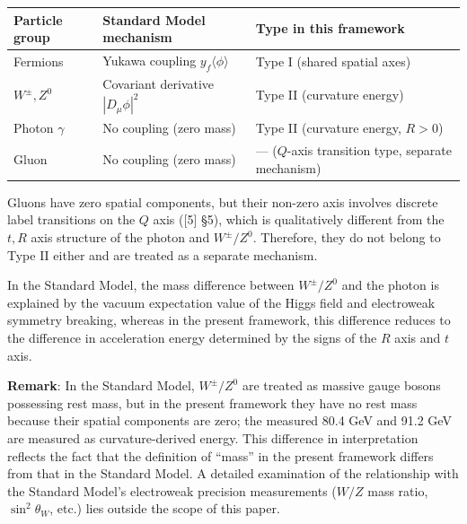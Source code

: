 \documentclass[
  a4paper,11pt]{article}
\newcounter{none}
\theoremstyle{definition}
\theoremstyle{remark}
\begin{document}
{\def\LTcaptype{none} %
\begin{longtable}[]{@{}
  >{\raggedright\arraybackslash}p{}
  >{\raggedright\arraybackslash}p{}
  >{\raggedright\arraybackslash}p{}@{}}
\toprule\noalign{}
\begin{minipage}[b]{\linewidth}\raggedright
Particle group
\end{minipage} & \begin{minipage}[b]{\linewidth}\raggedright
Standard Model mechanism
\end{minipage} & \begin{minipage}[b]{\linewidth}\raggedright
Type in this framework
\end{minipage} \\
\midrule\noalign{}
\endhead
\bottomrule\noalign{}
\endlastfoot
Fermions & Yukawa coupling \(y_f \langle\phi\rangle\) & Type I (shared
spatial axes) \\
\(W^{\pm}, Z^0\) & Covariant derivative \(|D_\mu\phi|^2\) & Type II
(curvature energy) \\
Photon \(\gamma\) & No coupling (zero mass) & Type II (curvature energy,
\(R > 0\)) \\
Gluon & No coupling (zero mass) & --- (\(Q\)-axis transition type,
separate mechanism) \\
\end{longtable}
}

Gluons have zero spatial components, but their non-zero axis involves
discrete label transitions on the \(Q\) axis ({[}5{]} §5), which is
qualitatively different from the \(t, R\) axis structure of the photon
and \(W^{\pm}/Z^0\). Therefore, they do not belong to Type II either and
are treated as a separate mechanism.

In the Standard Model, the mass difference between \(W^{\pm}/Z^0\) and
the photon is explained by the vacuum expectation value of the Higgs
field and electroweak symmetry breaking, whereas in the present
framework, this difference reduces to the difference in acceleration
energy determined by the signs of the \(R\) axis and \(t\) axis.

\textbf{Remark}: In the Standard Model, \(W^{\pm}/Z^0\) are treated as
massive gauge bosons possessing rest mass, but in the present framework
they have no rest mass because their spatial components are zero; the
measured 80.4 GeV and 91.2 GeV are measured as curvature-derived energy.
This difference in interpretation reflects the fact that the definition
of ``mass'' in the present framework differs from that in the Standard
Model. A detailed examination of the relationship with the Standard
Model's electroweak precision measurements (\(W/Z\) mass ratio,
\(\sin^2\theta_W\), etc.) lies outside the scope of this paper.
\end{document}

